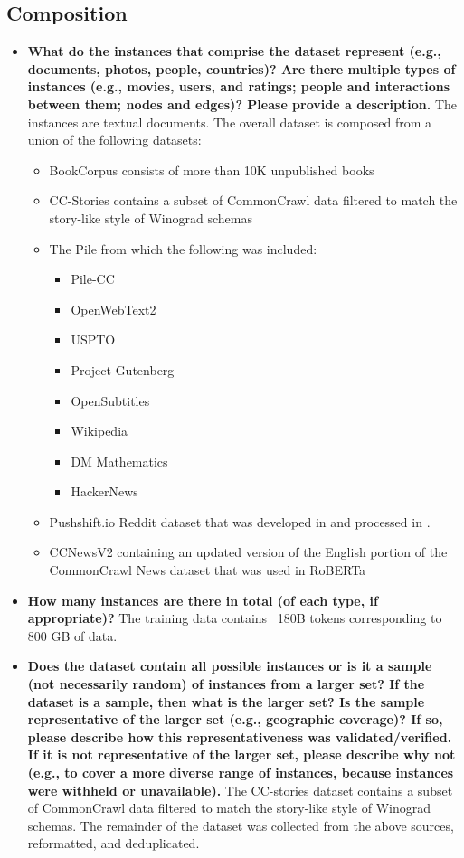 \subsection{Composition}
\begin{itemize}
    \item \textbf{What do the instances that comprise the dataset represent (e.g., documents, photos, people, countries)? Are there multiple types of instances (e.g., movies, users, and ratings; people and interactions between them; nodes and edges)? Please provide a description.} The instances are textual documents. The overall dataset is composed from a union of the following datasets:
    \begin{itemize}
        \item BookCorpus \cite{books2015} consists of more than 10K unpublished books
        \item CC-Stories \cite{ccstories2018} contains a subset of CommonCrawl data filtered to match the story-like style of Winograd schemas
        \item The Pile \cite{thepile} from which the following was included:
        \begin{itemize}
            \item Pile-CC
            \item OpenWebText2
            \item USPTO
            \item Project Gutenberg
            \item OpenSubtitles
            \item Wikipedia
            \item DM Mathematics
            \item HackerNews
        \end{itemize}
        \item Pushshift.io Reddit dataset that was developed in \citet{reddit2020} and processed in \citet{roller-etal-2021-recipes}.
        \item CCNewsV2 containing an updated version of the English portion of the CommonCrawl News dataset that was used in RoBERTa \cite{liu2019roberta}
    \end{itemize}
    \item \textbf{How many instances are there in total (of each type, if appropriate)?} The training data contains ~180B tokens corresponding to 800 GB of data.
    \item \textbf{Does the dataset contain all possible instances or is it a sample (not necessarily random) of instances from a larger set? If the dataset is a sample, then what is the larger set? Is the sample representative of the larger set (e.g., geographic coverage)? If so, please describe how this representativeness was validated/verified. If it is not representative of the larger set, please describe why not (e.g., to cover a more diverse range of instances, because instances were withheld or unavailable).} The CC-stories dataset contains a subset of CommonCrawl data filtered to match the story-like style of Winograd schemas. The remainder of the dataset was collected from the above sources, reformatted, and deduplicated.

\end{itemize}
